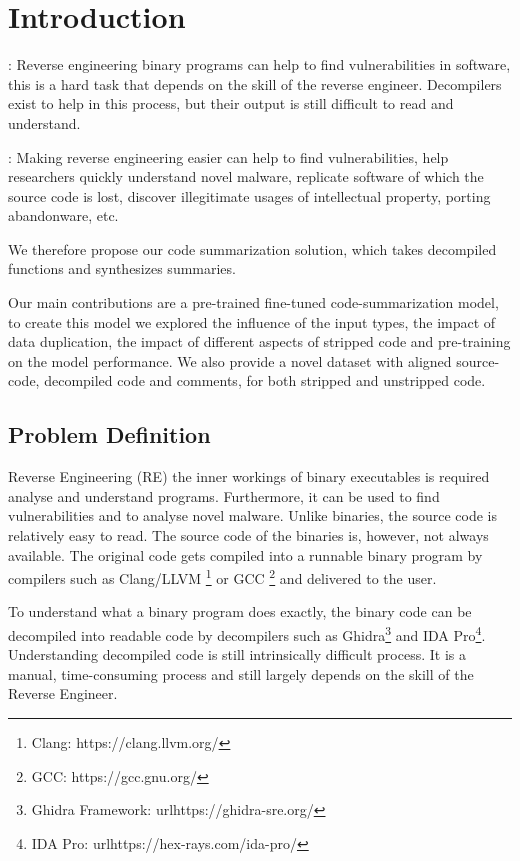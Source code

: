 \chapter{Introduction}
\label{introduction}

\begin{description}
\item[Problem definition]: Reverse engineering binary programs can help to find vulnerabilities in software, this is a hard task that depends on the skill of the reverse engineer. Decompilers exist to help in this process, but their output is still difficult to read and understand.

\item[Significance]: Making reverse engineering easier can help to find vulnerabilities, help researchers quickly understand novel malware, replicate software of which the source code is lost, discover illegitimate usages of intellectual property, porting abandonware, etc.


\item We therefore propose our code summarization solution, which takes decompiled functions and synthesizes summaries.


\item Our main contributions are a pre-trained fine-tuned code-summarization model, to create this model we explored the influence of the input types, the impact of data duplication, the impact of different aspects of stripped code and pre-training on the model performance. We also provide a novel dataset with aligned source-code, decompiled code and comments, for both stripped and unstripped code.


\end{description}
\newpage

\section{Problem Definition}
Reverse Engineering (RE) the inner workings of binary executables is required analyse and understand programs. Furthermore, it can be used to find vulnerabilities and to analyse novel malware. Unlike binaries, the source code is relatively easy to read. The source code of the binaries is, however, not always available. The original code gets compiled into a runnable binary program by compilers such as Clang/LLVM \footnote{Clang: https://clang.llvm.org/} or GCC \footnote{GCC: https://gcc.gnu.org/} and delivered to the user.

To understand what a binary program does exactly, the binary code can be decompiled into readable code by decompilers such as Ghidra\footnote{Ghidra Framework: url{https://ghidra-sre.org/}} and IDA Pro\footnote{IDA Pro: url{https://hex-rays.com/ida-pro/}}. Understanding decompiled code is still intrinsically difficult process. It is a manual, time-consuming process and still largely depends on the skill of the Reverse Engineer\cite{TypeInferenceSurvey}.

